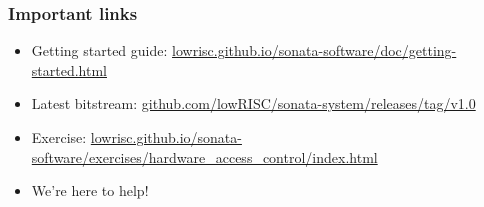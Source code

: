 \begin{frame}
  \frametitle{Important links}

  \begin{itemize}
    \item Getting started guide: \url{lowrisc.github.io/sonata-software/doc/getting-started.html}
    \item Latest bitstream: \url{github.com/lowRISC/sonata-system/releases/tag/v1.0}
    \item Exercise: \url{lowrisc.github.io/sonata-software/exercises/hardware_access_control/index.html}
    \item We're here to help!
  \end{itemize}
\end{frame}

